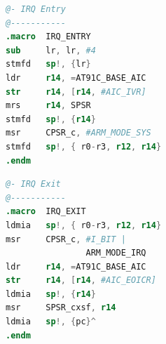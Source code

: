 \noindent\begin{minipage}{.45\textwidth}
\begin{lstlisting}[language=Assembler,caption={IRQ\_Entry},label={IRQEntry}]
@- IRQ Entry
@-----------
.macro	IRQ_ENTRY
sub     lr, lr, #4
stmfd   sp!, {lr}
ldr     r14, =AT91C_BASE_AIC
str     r14, [r14, #AIC_IVR]
mrs     r14, SPSR
stmfd   sp!, {r14}
msr     CPSR_c, #ARM_MODE_SYS 
stmfd   sp!, { r0-r3, r12, r14}
.endm
\end{lstlisting}
\end{minipage}\hfill
\begin{minipage}{.45\textwidth}
\begin{lstlisting}[language=Assembler,caption={IRQ\_EXIT},label={IRQExit}]
@- IRQ Exit
@-----------
.macro  IRQ_EXIT
ldmia   sp!, { r0-r3, r12, r14}
msr     CPSR_c, #I_BIT | 
				ARM_MODE_IRQ
ldr     r14, =AT91C_BASE_AIC
str     r14, [r14, #AIC_EOICR]
ldmia   sp!, {r14}
msr     SPSR_cxsf, r14
ldmia   sp!, {pc}^
.endm
\end{lstlisting}
\end{minipage}

